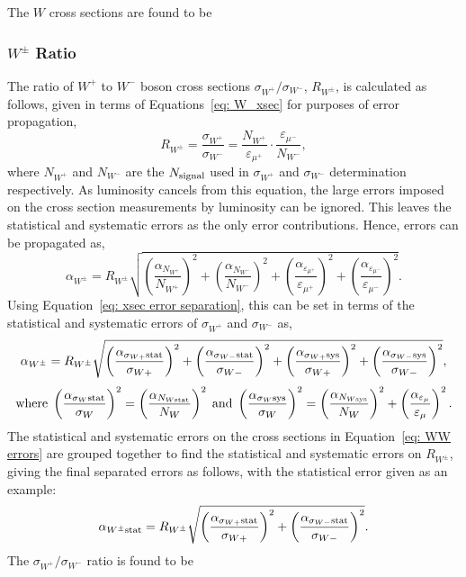 \documentclass[a4paper,12pt]{article}
\begin{document}
The $W$ cross sections are found to be



\subsubsection{$W^\pm$ Ratio}
The ratio of  $W^+$ to $W^-$ boson cross sections $\sigma_{W^+}/\sigma_{W^-}$, $R_{W^\pm}$, is calculated as follows, given in terms of Equations~\ref{eq: W_xsec} for purposes of error propagation,
\begin{equation}
    R_{W^\pm} = \frac{\sigma_{W^+}}{\sigma_{W^-}} = \frac{N_{W^+}}{\varepsilon_{\mu^+}} \cdot \frac{\varepsilon_{\mu^-}}{N_{W^-}},    
\end{equation}
where $N_{W^+}$ and $N_{W^-}$ are the $N_{\rm signal}$ used in $\sigma_{W^+}$ and $\sigma_{W^-}$ determination respectively.
As luminosity cancels from this equation, the large errors imposed on the cross section measurements by luminosity can be ignored.
This leaves the statistical and systematic errors as the only error contributions.
Hence, errors can be propagated as,
\begin{equation}
    \alpha_{W^\pm} = R_{W^\pm}\sqrt{\left(\frac{\alpha_{N_{W^+}}}{N_{W^+}}\right)^2 + \left(\frac{\alpha_{N_{W^-}}}{N_{W^-}}\right)^2 + \left(\frac{\alpha_{\varepsilon_{\mu^+}}}{\varepsilon_{\mu^+}}\right)^2 + \left(\frac{\alpha_{\varepsilon_{\mu^-}}}{\varepsilon_{\mu^-}}\right)^2}.
\end{equation}
Using Equation~\ref{eq: xsec error separation}, this can be set in terms of the statistical and systematic errors of $\sigma_{W^+}$ and $\sigma_{W^-}$ as,
\begin{equation}
       \alpha_{W^\pm} = R_{W^\pm}\sqrt{\left(\frac{\alpha_{\sigma_{W+} \rm stat}}{\sigma_{W+}}\right)^2 + \left(\frac{\alpha_{\sigma_{W-}\rm stat}}{\sigma_{W-}}\right)^2 + \left(\frac{\alpha_{\sigma_{W+} \rm sys}}{\sigma_{W+}}\right)^2 + \left(\frac{\alpha_{\sigma_{W-}\rm sys}}{\sigma_{W-}}\right)^2},
       \label{eq: WW errors}
\end{equation}
\begin{equation}
    {\rm where \;} \left(\frac{\alpha_{\sigma_{W}\rm stat}}{\sigma_{W}}\right)^2 = \left(\frac{\alpha_{N_{W \rm stat}}}{N_{W}}\right)^2 {\rm \; and \;} \left(\frac{\alpha_{\sigma_{W} \rm sys}}{\sigma_{W}}\right)^2 = \left(\frac{\alpha_{N_{W \rm sys}}}{N_{W}}\right)^2 + \left(\frac{\alpha_{\varepsilon_{\mu}}}{\varepsilon_{\mu}}\right)^2.
\end{equation}
The statistical and systematic errors on the cross sections in Equation~\ref{eq: WW errors} are grouped together to find the statistical and systematic errors on $R_{W^\pm}$, giving the final separated errors as follows, with the statistical error given as an example:
\begin{equation}
    \alpha_{W^\pm \rm stat} = R_{W^\pm}\sqrt{\left(\frac{\alpha_{\sigma_{W+} \rm stat}}{\sigma_{W+}}\right)^2 + \left(\frac{\alpha_{\sigma_{W-}\rm stat}}{\sigma_{W-}}\right)^2}.
\end{equation}
The $\sigma_{W^+}/\sigma_{W^-}$ ratio is found to be

\end{document}
